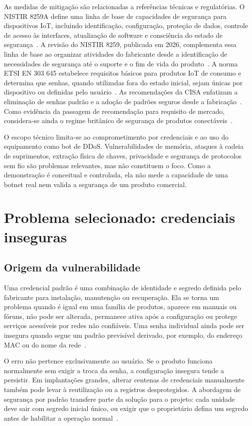 \documentclass[11pt,a4paper]{article}
\begin{document}
As medidas de mitigação são relacionadas a referências técnicas e regulatórias. O NISTIR 8259A define uma linha de base de capacidades de segurança para dispositivos IoT, incluindo identificação, configuração, proteção de dados, controle de acesso às interfaces, atualização de software e consciência do estado de segurança~\cite{nist8259a}. A revisão do NISTIR 8259, publicada em 2026, complementa essa linha de base ao organizar atividades do fabricante desde a identificação de necessidades de segurança até o suporte e o fim de vida do produto~\cite{nist8259r1}. A norma ETSI EN 303 645 estabelece requisitos básicos para produtos IoT de consumo e determina que senhas, quando utilizadas fora do estado inicial, sejam únicas por dispositivo ou definidas pelo usuário~\cite{etsi303645}. As recomendações da CISA enfatizam a eliminação de senhas padrão e a adoção de padrões seguros desde a fabricação~\cite{cisa2023passwords}. Como evidência da passagem de recomendação para requisito de mercado, considera-se ainda o regime britânico de segurança de produtos conectáveis~\cite{ukpsti2023}.

O escopo técnico limita-se ao comprometimento por credenciais e ao uso do equipamento como bot de DDoS. Vulnerabilidades de memória, ataques à cadeia de suprimentos, extração física de chaves, privacidade e segurança de protocolos sem fio são problemas relevantes, mas não constituem o foco. Como a demonstração é conceitual e controlada, ela não mede a capacidade de uma botnet real nem valida a segurança de um produto comercial.

\section{Problema selecionado: credenciais inseguras}
\subsection{Origem da vulnerabilidade}
Uma credencial padrão é uma combinação de identidade e segredo definida pelo fabricante para instalação, manutenção ou recuperação. Ela se torna um problema quando é igual em uma família de produtos, aparece em manuais ou fóruns, não pode ser alterada, permanece ativa após a configuração ou protege serviços acessíveis por redes não confiáveis. Uma senha individual ainda pode ser insegura quando segue um padrão previsível derivado, por exemplo, do endereço MAC ou do nome da rede~\cite{etsi303645}.

O erro não pertence exclusivamente ao usuário. Se o produto funciona normalmente sem exigir a troca da senha, a configuração insegura tende a persistir. Em implantações grandes, alterar centenas de credenciais manualmente também pode levar à reutilização ou a registros desprotegidos. A abordagem de segurança por padrão transfere parte da solução para o projeto: cada unidade deve sair com segredo inicial único, ou exigir que o proprietário defina um segredo antes de habilitar a operação normal~\cite{cisa2023passwords,etsi303645}.
\end{document}
